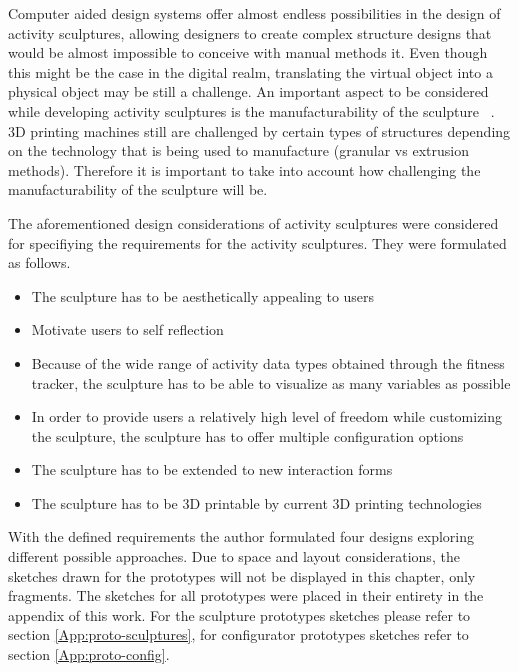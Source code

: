\documentclass[../medieninformatik-arbeit.tex]{subfiles}
\begin{document}
Computer aided design systems offer almost endless possibilities in the design of activity sculptures, allowing designers to create complex structure designs that would be almost impossible to conceive with manual methods it. Even though this might be the case in the digital realm, translating the virtual object into a physical object may be still a challenge. An important aspect to be considered while developing activity sculptures is the manufacturability of the sculpture \ \cite{swaminathan2014supporting}. 3D printing machines still are challenged by certain types of structures depending on the technology that is being used to manufacture (granular vs extrusion methods). Therefore it is important to take into account how challenging the manufacturability of the sculpture will be.

The aforementioned design considerations of activity sculptures were considered for specifiying the requirements for the activity sculptures. They were formulated as follows. 

\begin{itemize}
	\item The sculpture has to be aesthetically appealing to users
	\item Motivate users to self reflection
	\item Because of the wide range of activity data types obtained through the fitness tracker, the sculpture has to be able to visualize as many variables as possible
	\item In order to provide users a relatively high level of freedom while customizing the sculpture, the sculpture has to offer multiple configuration options
	\item The sculpture has to be extended to new interaction forms
	\item The sculpture has to be 3D printable by current 3D printing technologies
\end{itemize}

With the defined requirements the author formulated four designs exploring different possible approaches. Due to space and layout considerations, the sketches drawn for the prototypes will not be displayed in this chapter, only fragments. The sketches for all prototypes were placed in their entirety in the appendix of this work. For the sculpture prototypes sketches please refer to section \ref{App:proto-sculptures}, for configurator prototypes sketches refer to section \ref{App:proto-config}.
\end{document}
